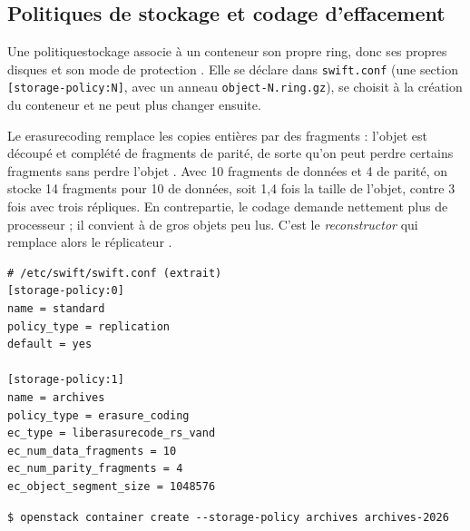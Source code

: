\subsection{Politiques de stockage et codage d'effacement}\label{sec:sw-politiques}

Une \gls{politiquestockage} associe à un conteneur son propre ring, donc ses propres disques et son mode de protection
\parencite{swift-policies}. Elle se déclare dans \texttt{swift.conf} (une section \texttt{[storage-policy:N]}, avec un anneau
\texttt{object-N.ring.gz}), se choisit à la création du conteneur et ne peut plus changer ensuite.

Le \gls{erasurecoding} remplace les copies entières par des fragments : l'objet est découpé et complété de fragments de
parité, de sorte qu'on peut perdre certains fragments sans perdre l'objet \parencite{swift-erasure}. Avec 10 fragments de
données et 4 de parité, on stocke 14 fragments pour 10 de données, soit 1,4 fois la taille de l'objet, contre 3 fois avec
trois répliques. En contrepartie, le codage demande nettement plus de processeur ; il convient à de gros objets peu lus.
C'est le \emph{reconstructor} qui remplace alors le réplicateur \parencite{swift-erasure}.

\par\noindent\begin{minipage}{\linewidth}
\begin{lstlisting}
# /etc/swift/swift.conf (extrait)
[storage-policy:0]
name = standard
policy_type = replication
default = yes

[storage-policy:1]
name = archives
policy_type = erasure_coding
ec_type = liberasurecode_rs_vand
ec_num_data_fragments = 10
ec_num_parity_fragments = 4
ec_object_segment_size = 1048576
\end{lstlisting}
\end{minipage}\par

\par\noindent\begin{minipage}{\linewidth}
\begin{lstlisting}[style=terminal]
$ openstack container create --storage-policy archives archives-2026
\end{lstlisting}
\end{minipage}\par

